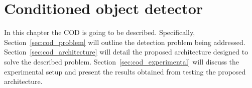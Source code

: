 \chapter{Conditioned object detector}
\label{ch:cod}
In this chapter the COD is going to be described. Specifically, Section~\ref{sec:cod_problem} will outline the detection problem being addressed. Section~\ref{sec:cod_architecture} will detail the proposed architecture designed to solve the described problem. Section~\ref{sec:cod_experimental} will discuss the experimental setup and present the results obtained from testing the proposed architecture.


